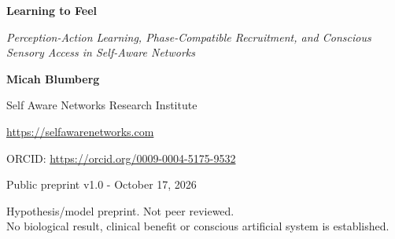 \documentclass[
  american,
  11pt,
  letterpaper,
]{article}
\author{}
\date{}
\begin{document}
\begin{center}
{\LARGE\bfseries Learning to Feel\par}
\vspace{0.35em}
{\large\itshape Perception-Action Learning, Phase-Compatible Recruitment, and Conscious Sensory Access in Self-Aware Networks\par}
\vspace{0.8em}
{\small\textbf{Micah Blumberg}\par}
{\small Self Aware Networks Research Institute\par}
{\small\url{https://selfawarenetworks.com}\par}
{\small ORCID: \url{https://orcid.org/0009-0004-5175-9532}\par}
{\small Public preprint v1.0 - October 17, 2026\par}
\end{center}

\begin{center}\small
Hypothesis/model preprint. Not peer reviewed.\\
No biological result, clinical benefit or conscious artificial system is established.
\end{center}
\end{document}

